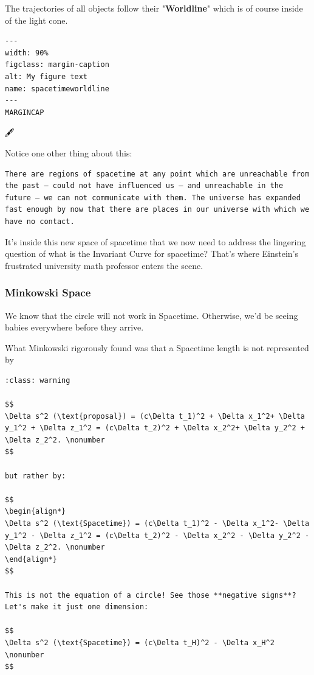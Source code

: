 \documentclass[
]{article}
\begin{document}
The trajectories of all objects follow their "\textbf{Worldline}" which
is of course inside of the light cone.

\begin{verbatim}
---
width: 90%
figclass: margin-caption
alt: My figure text
name: spacetimeworldline
---
MARGINCAP
\end{verbatim}


🖋 📓

Notice one other thing about this:

\begin{verbatim}
There are regions of spacetime at any point which are unreachable from the past – could not have influenced us – and unreachable in the future – we can not communicate with them. The universe has expanded fast enough by now that there are places in our universe with which we have no contact.
\end{verbatim}

It's inside this new space of spacetime that we now need to address the
lingering question of what is the Invariant Curve for spacetime? That's
where Einstein's frustrated university math professor enters the scene.

\hypertarget{minkowski-space}{%
\subsubsection{Minkowski Space}\label{minkowski-space}}

We know that the circle will not work in Spacetime. Otherwise, we'd be
seeing babies everywhere before they arrive.

What Minkowski rigorously found was that a Spacetime length is not
represented by

\begin{verbatim}
:class: warning

$$
\Delta s^2 (\text{proposal}) = (c\Delta t_1)^2 + \Delta x_1^2+ \Delta y_1^2 + \Delta z_1^2 = (c\Delta t_2)^2 + \Delta x_2^2+ \Delta y_2^2 + \Delta z_2^2. \nonumber
$$

but rather by:

$$
\begin{align*}
\Delta s^2 (\text{Spacetime}) = (c\Delta t_1)^2 - \Delta x_1^2- \Delta y_1^2 - \Delta z_1^2 = (c\Delta t_2)^2 - \Delta x_2^2 - \Delta y_2^2 - \Delta z_2^2. \nonumber
\end{align*}
$$

This is not the equation of a circle! See those **negative signs**? Let's make it just one dimension:

$$
\Delta s^2 (\text{Spacetime}) = (c\Delta t_H)^2 - \Delta x_H^2 \nonumber
$$
\end{verbatim}
\end{document}
